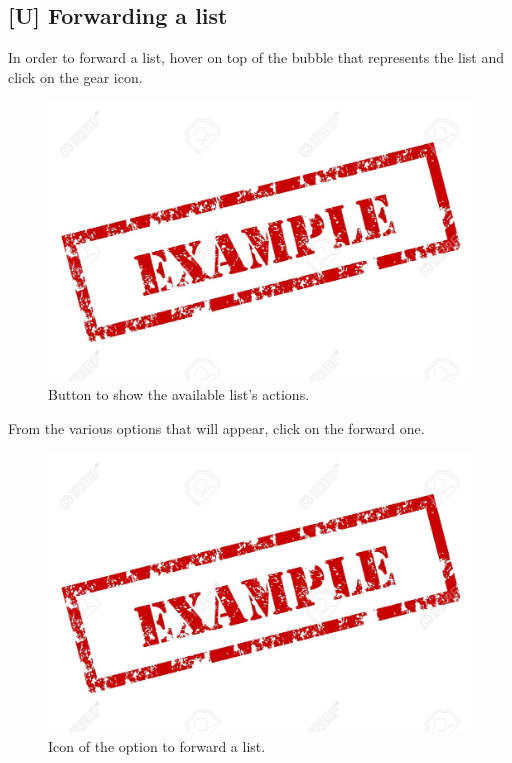 \subsection{[U] Forwarding a list}
In order to forward a list, hover on top of the bubble that represents the list and click on the gear icon.

\begin{figure}[H]
  \centering 
  \includegraphics[width=\textwidth]{Sections/3-HowToUse/Images/example.jpeg}
  \caption{Button to show the available list's actions.}
\end{figure}

From the various options that will appear, click on the forward one.

\begin{figure}[H]
  \centering 
  \includegraphics[width=\textwidth]{Sections/3-HowToUse/Images/example.jpeg}
  \caption{Icon of the option to forward a list.}
\end{figure}

